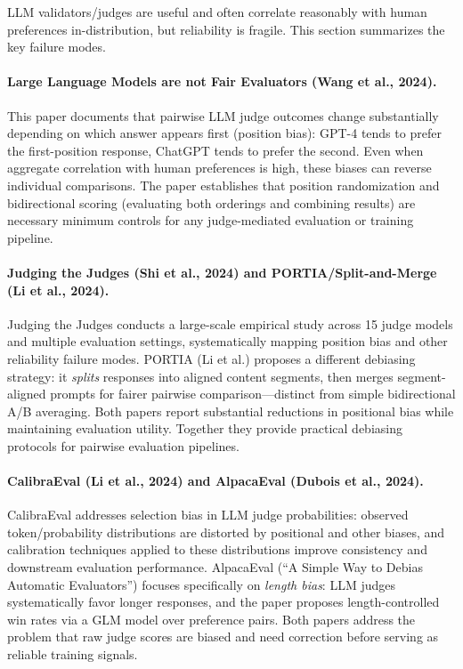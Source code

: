\documentclass[11pt]{article}
\begin{document}
LLM validators/judges are useful and often correlate reasonably with human preferences in-distribution, but reliability is fragile. This section summarizes the key failure modes.

\paragraph{Large Language Models are not Fair Evaluators (Wang et al., 2024).}
This paper documents that pairwise LLM judge outcomes change substantially depending on which answer appears first (position bias): GPT-4 tends to prefer the first-position response, ChatGPT tends to prefer the second. Even when aggregate correlation with human preferences is high, these biases can reverse individual comparisons. The paper establishes that position randomization and bidirectional scoring (evaluating both orderings and combining results) are necessary minimum controls for any judge-mediated evaluation or training pipeline.

\paragraph{Judging the Judges (Shi et al., 2024) and PORTIA/Split-and-Merge (Li et al., 2024).}
Judging the Judges conducts a large-scale empirical study across 15 judge models and multiple evaluation settings, systematically mapping position bias and other reliability failure modes. PORTIA (Li et al.) proposes a different debiasing strategy: it \emph{splits} responses into aligned content segments, then merges segment-aligned prompts for fairer pairwise comparison---distinct from simple bidirectional A/B averaging. Both papers report substantial reductions in positional bias while maintaining evaluation utility. Together they provide practical debiasing protocols for pairwise evaluation pipelines.

\paragraph{CalibraEval (Li et al., 2024) and AlpacaEval (Dubois et al., 2024).}
CalibraEval addresses selection bias in LLM judge probabilities: observed token/probability distributions are distorted by positional and other biases, and calibration techniques applied to these distributions improve consistency and downstream evaluation performance. AlpacaEval (``A Simple Way to Debias Automatic Evaluators'') focuses specifically on \emph{length bias}: LLM judges systematically favor longer responses, and the paper proposes length-controlled win rates via a GLM model over preference pairs. Both papers address the problem that raw judge scores are biased and need correction before serving as reliable training signals.
\end{document}
